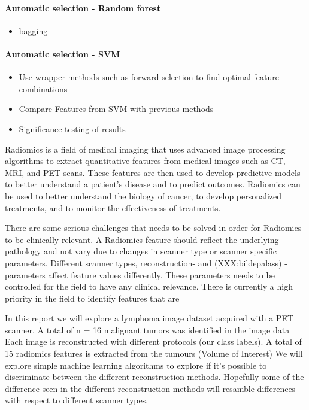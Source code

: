\paragraph{Automatic selection - Random forest} 
\begin{itemize}
    \item bagging
\end{itemize}

\paragraph{Automatic selection - SVM} 
\begin{itemize}
    \item Use wrapper methods such as forward selection to find optimal feature
        combinations
    \item Compare Features from SVM with previous methods
    \item Significance testing of results
\end{itemize}


Radiomics is a field of medical imaging that uses advanced
image processing algorithms to extract quantitative features from medical
images such as CT, MRI, and PET scans. These features are then used to develop
predictive models to better understand a patient's disease and to predict
outcomes. Radiomics can be used to better understand the biology of cancer, to
develop personalized treatments, and to monitor the effectiveness of
treatments.


There are some serious challenges that needs to be solved in order for
Radiomics to be clinically relevant.     
A Radiomics feature should reflect the underlying pathology and not vary due to
changes in scanner type or scanner specific parameters. Different scanner
types, reconstruction- and (XXX:bildepalass) -parameters affect feature values
differently. These parameters needs to be controlled for the field to have any
clinical relevance. 
There is currently a high priority in the field to identify features that are




In this report we will explore a lymphoma image dataset acquired with a PET %
scanner. A total of n = 16 malignant tumors was identified in the image data 
Each image is reconstructed with different protocols (our class
labels). A total of 15 radiomics features is extracted from the tumours (Volume
of Interest) 
We will explore simple machine learning algorithms to explore if it's possible
to discriminate between the different reconstruction methods. Hopefully some of
the difference seen in the different reconstruction methods will resamble
differences with respect to different scanner types.    

